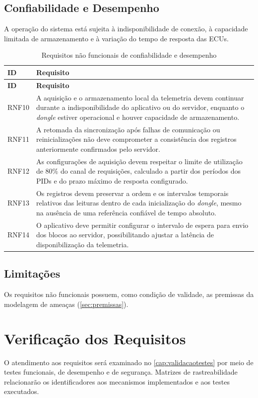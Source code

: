 \subsection{Confiabilidade e Desempenho}

A operação do sistema está sujeita à indisponibilidade de conexão, à capacidade limitada de armazenamento e à variação do tempo de resposta das ECUs. 

\begin{longtable}{p{}p{}}
\caption{Requisitos não funcionais de confiabilidade e desempenho}
\label{tab:rnf-desempenho}\\
\hline
\textbf{ID} & \textbf{Requisito} \\
\hline
\endfirsthead

\hline
\textbf{ID} & \textbf{Requisito} \\
\hline
\endhead

RNF10 & A aquisição e o armazenamento local da telemetria
devem continuar durante a indisponibilidade do aplicativo
ou do servidor, enquanto o \textit{dongle} estiver operacional
e houver capacidade de armazenamento. \\

RNF11 & A retomada da sincronização após falhas de comunicação
ou reinicializações não deve comprometer a consistência
dos registros anteriormente confirmados pelo servidor. \\

RNF12 & As configurações de aquisição devem respeitar o
limite de utilização de 80\% do canal de requisições,
calculado a partir dos períodos dos PIDs e do prazo
máximo de resposta configurado. \\

RNF13 & Os registros devem preservar a ordem e os intervalos
temporais relativos das leituras dentro de cada inicialização
do \textit{dongle}, mesmo na ausência de uma referência confiável
de tempo absoluto. \\

RNF14 & O aplicativo deve permitir configurar o intervalo
de espera para envio dos blocos ao servidor, possibilitando
ajustar a latência de disponibilização da telemetria. \\

\hline
\end{longtable}


\subsection{Limitações}

Os requisitos não funcionais possuem, como condição de validade, as premissas da modelagem de ameaças (\autoref{sec:premissas}). 

\section{Verificação dos Requisitos}

O atendimento aos requisitos será examinado no \autoref{cap:validacaotestes} por meio de testes funcionais, de desempenho e de segurança. Matrizes de rastreabilidade relacionarão os identificadores aos mecanismos implementados e aos testes executados.